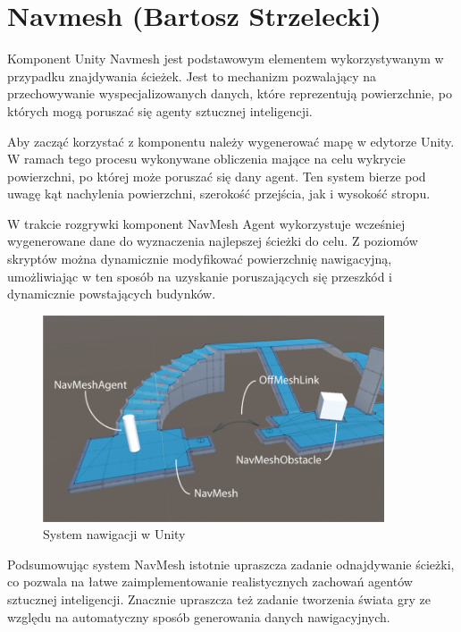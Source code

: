 \section{Navmesh (Bartosz Strzelecki)}

Komponent Unity Navmesh jest podstawowym elementem wykorzystywanym w przypadku znajdywania ścieżek.
Jest to mechanizm pozwalający na przechowywanie wyspecjalizowanych danych, które reprezentują
powierzchnie, po których mogą poruszać się agenty sztucznej inteligencji.

Aby zacząć korzystać z komponentu należy wygenerować mapę w edytorze Unity.
W ramach tego procesu wykonywane obliczenia mające na celu wykrycie powierzchni,
po której może poruszać się dany agent. Ten system bierze pod uwagę kąt nachylenia
powierzchni, szerokość przejścia, jak i wysokość stropu.

W trakcie rozgrywki komponent NavMesh Agent wykorzystuje wcześniej wygenerowane dane
do wyznaczenia najlepszej ścieżki do celu. Z poziomów skryptów można dynamicznie modyfikować powierzchnię
nawigacyjną, umożliwiając w ten sposób na uzyskanie poruszających się przeszkód i dynamicznie powstających budynków.

\begin{figure}[h!]
    \centering
    \includegraphics[width=0.9\textwidth]{images/navmesh.png}
    \caption{System nawigacji w Unity}
\end{figure}

Podsumowując system NavMesh istotnie upraszcza zadanie odnajdywanie ścieżki, co pozwala na łatwe zaimplementowanie
realistycznych zachowań agentów sztucznej inteligencji. Znacznie upraszcza też zadanie tworzenia świata gry ze względu na automatyczny
sposób generowania danych nawigacyjnych.

